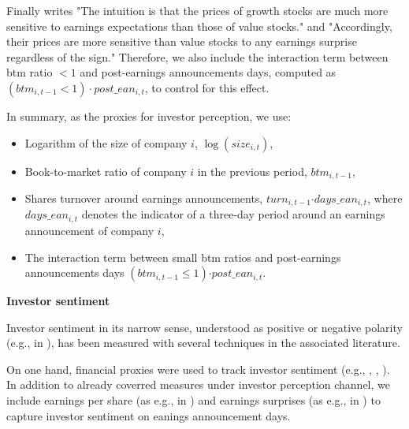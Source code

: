 \documentclass[11pt]{article}
\providecommand{\tightlist}{%
  \setlength{\itemsep}{0pt}\setlength{\parskip}{0pt}}
\begin{document}
Finally \cite{DONNELLY2014} writes "The intuition is that the prices of growth stocks are much more sensitive to earnings expectations than those of value stocks." and "Accordingly, their prices are more sensitive than value stocks to any earnings surprise regardless of the sign." Therefore, we also include the interaction term between btm ratio $<1$ and post-earnings announcements  days, computed as $(btm_{i,t-1}<1)\cdot post\_ean_{i,t}$, to control for this effect.

In summary, as the proxies for investor perception, we use:

\begin{itemize}
\tightlist
\item
Logarithm of the size of company \(i\),  \(\log(size_{i,t})\),
\item
Book-to-market ratio of company \(i\) in  the previous period,   \(btm_{i,t-1}\),
\item
  Shares turnover around earnings announcements, $turn_{i,t-1}$$\cdot days\_ean_{i,t}$, where  \(days\_ean_{i,t}\) denotes the indicator of a three-day period around an earnings announcement of company \(i\),
\item
  The interaction term between small btm ratios and post-earnings announcements days $(btm_{i,t-1}\leq 1)$$\cdot post\_ean_{i,t}$.
\end{itemize}

{\bf {Investor sentiment}}

Investor sentiment in its narrow sense, understood as positive or negative polarity  (e.g., in \cite{FRANKEL2022}), has been measured with several techniques in the associated literature.

On one hand, financial proxies were used to track investor sentiment (e.g., \cite{de1990noise}, \cite{barberis1998model}, \cite{baker2007investor}). In addition to already coverred measures under investor perception channel, we include earnings per share (as e.g., in \cite{henry2006}) and earnings surprises (as e.g., in \cite{Maheu2004}) to capture investor sentiment on eanings announcement days.
\end{document}
